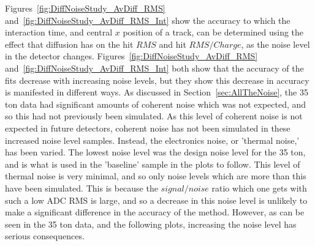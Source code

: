 Figures~\ref{fig:DiffNoiseStudy_AvDiff_RMS} and~\ref{fig:DiffNoiseStudy_AvDiff_RMS_Int} show the accuracy to which the interaction time, and central $x$ position of a track, can be determined using the effect that diffusion has on the hit $RMS$ and hit $RMS/Charge$, as the noise level in the detector changes. Figures~\ref{fig:DiffNoiseStudy_AvDiff_RMS} and~\ref{fig:DiffNoiseStudy_AvDiff_RMS_Int} both show that the accuracy of the fits decrease with increasing noise levels, but they show this decrease in accuracy is manifested in different ways. As discussed in Section~\ref{sec:AllTheNoise}, the 35 ton data had significant amounts of coherent noise which was not expected, and so this had not previously been simulated. As this level of coherent noise is not expected in future detectors, coherent noise has not been simulated in these increased noise level samples. Instead, the electronics noise, or 'thermal noise,' has been varied. The lowest noise level was the design noise level for the 35 ton, and is what is used in the 'baseline' sample in the plots to follow. This level of thermal noise is very minimal, and so only noise levels which are more than this have been simulated. This is because the $signal/noise$ ratio which one gets with such a low ADC RMS is large, and so a decrease in this noise level is unlikely to make a significant difference in the accuracy of the method. However, as can be seen in the 35 ton data, and the following plots, increasing the noise level has serious consequences. \\

